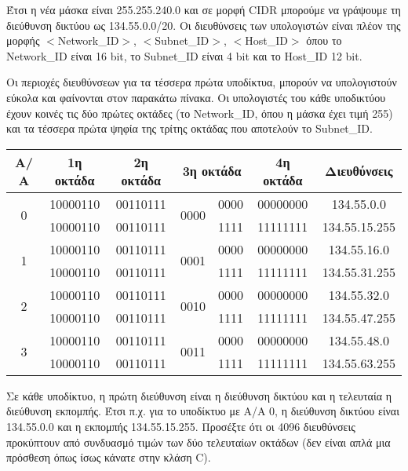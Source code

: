 Έτσι η νέα μάσκα είναι 255.255.240.0 και σε μορφή CIDR μπορούμε να γράψουμε τη διεύθυνση δικτύου ως 134.55.0.0/20. Οι διευθύνσεις των υπολογιστών είναι πλέον της μορφής $<$Network\_ID$>$, $<$Subnet\_ID$>$, $<$Host\_ID$>$ όπου το Network\_ID είναι 16 bit, το Subnet\_ID είναι 4 bit και το Host\_ID 12 bit.

Οι περιοχές διευθύνσεων για τα τέσσερα πρώτα υποδίκτυα, μπορούν να υπολογιστούν εύκολα και φαίνονται στον παρακάτω πίνακα. Οι υπολογιστές του κάθε υποδικτύου έχουν κοινές τις δύο πρώτες οκτάδες (το Network\_ID, όπου η μάσκα έχει τιμή 255) και τα τέσσερα πρώτα ψηφία της τρίτης οκτάδας που αποτελούν το Subnet\_ID. 


\begin{center}
\fontsize{10}{12}
\ttfamily
\begin{tabular}{|c|c|c|c|c|c|c|}
\hline
    Α/Α              & 1η οκτάδα & 2η οκτάδα & \multicolumn{2}{c|}{3η οκτάδα} & 4η οκτάδα & Διευθύνσεις \\ \hline
\multirow{2}{*}{0} & 10000110  & 00110111 & \multirow{2}{*}{0000}  & 0000 & 00000000 & 134.55.0.0 \\ \cline{2-3} \cline{5-7} 
                  & 10000110 & 00110111 &                    & 1111 & 11111111 & 134.55.15.255 \\ \hline
\multirow{2}{*}{1} & 10000110  & 00110111 & \multirow{2}{*}{0001}  & 0000 & 00000000 & 134.55.16.0 \\ \cline{2-3} \cline{5-7} 
                  & 10000110 & 00110111 &                    & 1111 & 11111111 & 134.55.31.255 \\ \hline
\multirow{2}{*}{2} & 10000110 & 00110111 & \multirow{2}{*}{0010}  & 0000 & 00000000 & 134.55.32.0 \\ \cline{2-3} \cline{5-7} 
                  & 10000110  & 00110111 &                    & 1111 & 11111111 & 134.55.47.255 \\ \hline
\multirow{2}{*}{3} & 10000110  & 00110111 & \multirow{2}{*}{0011}  & 0000 & 00000000 & 134.55.48.0 \\ \cline{2-3} \cline{5-7} 
                  & 10000110 & 00110111 &                    & 1111 & 11111111 & 134.55.63.255 \\ \hline
\end{tabular}
\normalfont
\end{center}

Σε κάθε υποδίκτυο, η πρώτη διεύθυνση είναι η διεύθυνση δικτύου και η τελευταία η διεύθυνση εκπομπής. Έτσι π.χ. για το υποδίκτυο με Α/Α 0, η διεύθυνση δικτύου είναι 134.55.0.0 και η εκπομπής 134.55.15.255. Προσέξτε ότι οι 4096 διευθύνσεις προκύπτουν από συνδυασμό τιμών των δύο τελευταίων οκτάδων (δεν είναι απλά μια πρόσθεση όπως ίσως κάνατε στην κλάση C).
